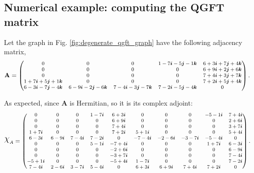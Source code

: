 
\subsection{Numerical example: computing the QGFT matrix}

Let the graph in Fig. \ref{fig:degenerate_qgft_graph} have the following adjacency matrix,
\begin{equation*}
\footnotesize
\mathbf{A} = \begin{pmatrix}
0 & 0 & 0 & 1 -7\boldsymbol{i} -5\boldsymbol{j} -1\boldsymbol{k} & 6 +3\boldsymbol{i} +7\boldsymbol{j} +4\boldsymbol{k} \\
0 & 0 & 0 & 0 & 6 +9\boldsymbol{i} +2\boldsymbol{j} +6\boldsymbol{k} \\
0 & 0 & 0 & 0 & 7 +4\boldsymbol{i} +3\boldsymbol{j} +7\boldsymbol{k} \\
1 +7\boldsymbol{i} +5\boldsymbol{j} +1\boldsymbol{k} & 0 & 0 & 0 & 7 +2\boldsymbol{i} +5\boldsymbol{j} +4\boldsymbol{k} \\
6 -3\boldsymbol{i} -7\boldsymbol{j} -4\boldsymbol{k} & 6 -9\boldsymbol{i} -2\boldsymbol{j} -6\boldsymbol{k} & 7 -4\boldsymbol{i} -3\boldsymbol{j} -7\boldsymbol{k} & 7 -2\boldsymbol{i} -5\boldsymbol{j} -4\boldsymbol{k} & 0 \\
\end{pmatrix}.
\end{equation*}

As expected, since $ \mathbf{A}$ is Hermitian, so it is its complex adjoint:
\begin{equation*}
\footnotesize
\rchi_A = 
\begin{pmatrix}
0 &  0 &  0 &  1 -7 \qi &  6 +3 \qi &  0 &  0 & 0 & -5 -1 \qi &  7 +4 \qi \\
0 &  0 &  0 &  0 &  6 +9 \qi &  0 &  0 & 0 &  0 &  2 +6 \qi \\
0 &  0 &  0 &  0 &  7 +4 \qi &  0 &  0 & 0 &  0 &  3 +7 \qi \\
1 +7 \qi &  0 &  0 &  0 &  7 +2 \qi &  5 +1 \qi &  0 & 0 &  0 &  5 +4 \qi \\
6 -3 \qi &  6 -9 \qi &  7 -4 \qi &  7 -2 \qi &  0 & -7 -4 \qi & -2 -6 \qi & -3 -7 \qi & -5 -4 \qi &  0 \\
0 & 0 & 0 &  5 -1 \qi & -7 +4 \qi &  0 &  0 & 0 &  1 +7 \qi &  6 -3 \qi \\
0 & 0 & 0 & 0 & -2 +6 \qi &  0 &  0 & 0 &  0 &  6 -9 \qi \\
0 & 0 & 0 & 0 & -3 +7 \qi &  0 &  0 & 0 &  0 &  7 -4 \qi \\
-5 +1 \qi & 0 & 0 & 0 & -5 +4 \qi &  1 -7 \qi &  0 & 0 &  0 &  7 -2 \qi \\
7 -4 \qi &  2 -6 \qi &  3 -7 \qi &  5 -4 \qi & 0 &  6 +3 \qi &  6 +9 \qi & 7 +4 \qi &  7 +2 \qi &  0
\end{pmatrix}.
\end{equation*}

